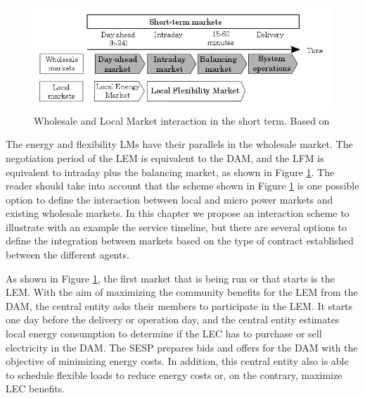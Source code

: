\begin{figure}[]
	\centering
	\includegraphics[width=1\columnwidth ]{ChapterIntro/Figures/LM_WSM_Interaction.jpg}
		\caption{Wholesale and Local Market interaction in the short term. Based on \cite{InternationalEnergyAgency2016}}
	\label{fig:212}  
\end{figure}


The energy and flexibility LMs have their parallels in the wholesale market. The negotiation period of the LEM is equivalent to the DAM, and the LFM is equivalent to intraday plus the balancing market, as shown in Figure \ref{fig:212}. The reader should take into account that the scheme shown in Figure \ref{fig:212} is one possible option to define the interaction between local and micro power markets and existing wholesale markets. In this chapter we propose an interaction scheme to illustrate with an example the service timeline, but there are several options to define the integration between markets based on the type of contract established between the different agents.

As shown in Figure \ref{fig:212}, the first market that is being run or that starts is the LEM. With the aim of maximizing the community benefits for the LEM from the DAM, the central entity asks their members to participate in the LEM. It starts one day before the delivery or operation day, and the central entity estimates local energy consumption to determine if the LEC has to purchase or sell electricity in the DAM. The SESP prepares bids and offers for the DAM with the objective of minimizing energy costs. In addition, this central entity also is able to schedule flexible loads to reduce energy costs or, on the contrary, maximize LEC benefits.

